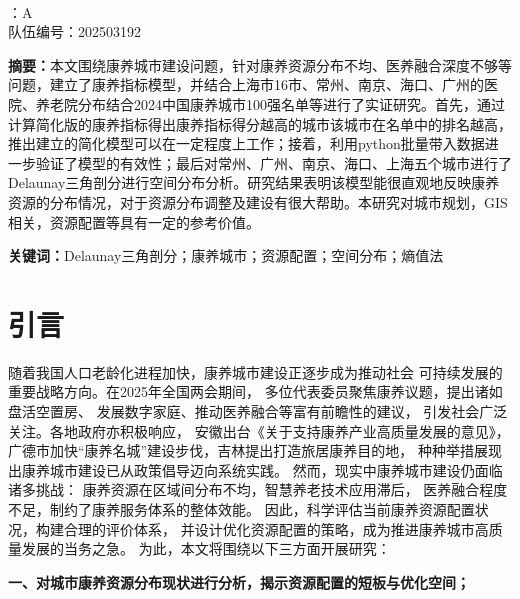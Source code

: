 \documentclass[12pt,a4paper]{article}
\begin{document}
\thispagestyle{empty}
\begin{center}
     \\
    \vspace{1em}
    ：A \\
    \quad 队伍编号：202503192 \\
\end{center}

\vspace{2em}

\noindent\textbf{摘要：}本文围绕康养城市建设问题，针对康养资源分布不均、医养融合深度不够等问题，建立了康养指标模型，并结合上海市16市、常州、南京、海口、广州的医院、养老院分布结合2024中国康养城市100强名单等进行了实证研究。首先，通过计算简化版的康养指标得出康养指标得分越高的城市该城市在名单中的排名越高，推出建立的简化模型可以在一定程度上工作；接着，利用python批量带入数据进一步验证了模型的有效性；最后对常州、广州、南京、海口、上海五个城市进行了Delaunay三角剖分进行空间分布分析。研究结果表明该模型能很直观地反映康养资源的分布情况，对于资源分布调整及建设有很大帮助。本研究对城市规划，GIS相关，资源配置等具有一定的参考价值。

\vspace{1em}

\noindent\textbf{关键词：}Delaunay三角剖分；康养城市；资源配置；空间分布；熵值法

\newpage

\section{引言}

随着我国人口老龄化进程加快，康养城市建设正逐步成为推动社会
可持续发展的重要战略方向。在2025年全国两会期间，
多位代表委员聚焦康养议题，提出诸如盘活空置房、
发展数字家庭、推动医养融合等富有前瞻性的建议，
引发社会广泛关注。各地政府亦积极响应，
安徽出台《关于支持康养产业高质量发展的意见》\cite{01}，
广德市加快“康养名城”建设步伐，吉林提出打造旅居康养目的地，
种种举措展现出康养城市建设已从政策倡导迈向系统实践。
然而，现实中康养城市建设仍面临诸多挑战：
康养资源在区域间分布不均，智慧养老技术应用滞后，
医养融合程度不足，制约了康养服务体系的整体效能。
因此，科学评估当前康养资源配置状况，构建合理的评价体系，
并设计优化资源配置的策略，成为推进康养城市高质量发展的当务之急。
为此，本文将围绕以下三方面开展研究：

\textbf{一、对城市康养资源分布现状进行分析，揭示资源配置的短板与优化空间；}
\end{document}
